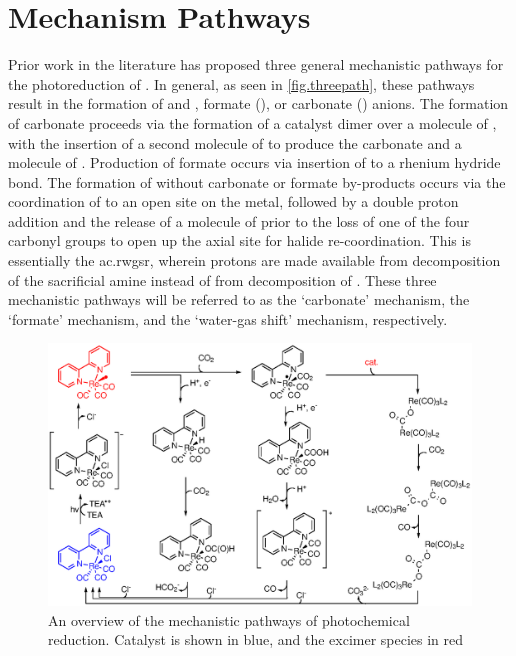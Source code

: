 \section{Mechanism Pathways}

Prior work in the literature has proposed three general mechanistic pathways for the photoreduction of . In general, as seen in \autoref{fig.threepath}, these pathways result in the formation of  and , formate (), or carbonate () anions. The formation of carbonate proceeds via the formation of a catalyst dimer over a molecule of , with the insertion of a second molecule of  to produce the carbonate and a molecule of . Production of formate occurs via insertion of  to a rhenium hydride bond. The formation of  without carbonate or formate by-products occurs via the coordination of  to an open site on the metal, followed by a double proton addition and the release of a molecule of  prior to the loss of one of the four carbonyl groups to open up the axial site for halide re-coordination. This is essentially the \gls{ac.rwgsr}, wherein protons are made available from decomposition of the sacrificial amine instead of from decomposition of \autocite{kalyanasundaram1978}. These three mechanistic pathways will be referred to as the `carbonate' mechanism, the `formate' mechanism, and the `water-gas shift' mechanism, respectively.

\begin{figure}[!htb]
 \begin{center}
  \includegraphics[clip=true, width=\textwidth, keepaspectratio]{images/threepaths.eps}
 \end{center}
\caption[Overview of mechanistic pathways]{An overview of the mechanistic pathways of photochemical  reduction. Catalyst is shown in blue, and the excimer species in red}
\label{fig.threepath}
\end{figure} 

